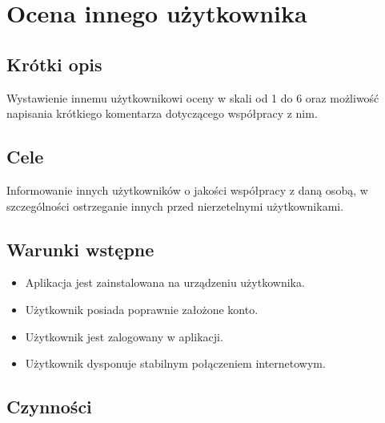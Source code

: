 \documentclass[licencjacka]{pracamgr}
\begin{document}
\section{Ocena innego użytkownika}
    \subsection{Krótki opis}
    Wystawienie innemu użytkownikowi oceny w skali od 1 do 6 oraz możliwość napisania krótkiego komentarza dotyczącego współpracy z nim.
    \subsection{Cele}
    Informowanie innych użytkowników o jakości współpracy z daną osobą, w szczególności ostrzeganie innych przed nierzetelnymi użytkownikami.
    \subsection{Warunki wstępne}
    \begin{itemize}
        \item Aplikacja jest zainstalowana na urządzeniu użytkownika.
        \item Użytkownik posiada poprawnie założone konto.
        \item Użytkownik jest zalogowany w aplikacji.
        \item Użytkownik dysponuje stabilnym połączeniem internetowym.
    \end{itemize}
    \subsection{Czynności}
\end{document}

